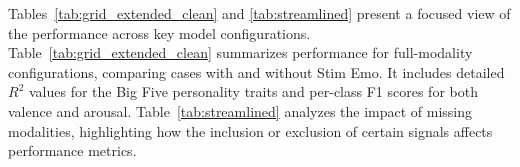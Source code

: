 \documentclass[sigconf]{acmart}
\begin{document}
\begin{table}[ht]
\centering
\caption{Focused Analysis on Personality and Emotion Performance in Selected Grid Configurations.}
\label{tab:streamlined}
\end{table}


Tables~\ref{tab:grid_extended_clean} and \ref{tab:streamlined} present a focused view of the performance across key model configurations. Table~\ref{tab:grid_extended_clean} summarizes performance for full-modality configurations, comparing cases with and without Stim Emo. It includes detailed $R^2$ values for the Big Five personality traits and per-class F1 scores for both valence and arousal. Table~\ref{tab:streamlined} analyzes the impact of missing modalities, highlighting how the inclusion or exclusion of certain signals affects performance metrics.
\end{document}
